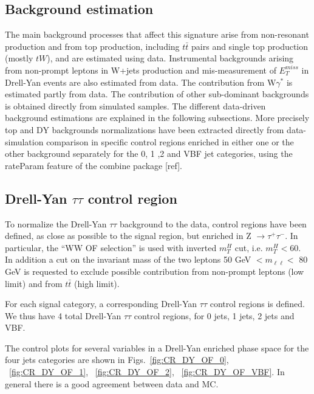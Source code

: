 \newpage
\subsection*{Background estimation}
The main background processes that affect this signature arise from non-resonant \WW production and from top production, including $t \bar{t}$ pairs and single top production (mostly $tW$), and are estimated using data. Instrumental backgrounds arising from non-prompt leptons in
W+jets production and mis-measurement of $E_T^{miss}$ in Drell-Yan events are also estimated from
data. The contribution from W$\gamma^*$  is estimated partly from data. The
contribution of other sub-dominant backgrounds is obtained directly from simulated samples. The different data-driven background estimations are explained in the following subsections. More precisely top and DY backgrounds normalizations have been extracted
directly from data-simulation comparison in specific control regions enriched in either one
or the other background separately for the 0, 1 ,2 and VBF jet categories, using the rateParam feature of the combine package [ref].
\subsection*{Drell-Yan $\tau\tau$ control region}
To normalize the Drell-Yan $\tau\tau$ background to the data, control regions
have been defined, as close as possible to the signal region, but enriched in
Z $\rightarrow \tau^+ \tau^-$. In particular, the ``WW OF selection'' is used with
inverted $m_T^H$ cut, i.e. $m_T^H<60$. In addition a cut on the invariant mass
of the two leptons 50 GeV $< m_{\ell \ell} <$ 80 GeV is requested to exclude
possible contribution from non-prompt leptons (low limit) and from  $t \bar{t}$ (high
limit).

For each signal category, a corresponding Drell-Yan $\tau\tau$ control
regions is defined. We thus have 4 total  Drell-Yan $\tau\tau$ control
regions, for 0 jets, 1 jets, 2 jets and VBF.

The control plots for several variables in a Drell-Yan enriched phase space
for the four jets categories are shown in Figs.~\ref{fig:CR_DY_OF_0},
~\ref{fig:CR_DY_OF_1}, ~\ref{fig:CR_DY_OF_2}, ~\ref{fig:CR_DY_OF_VBF}.
In general there is a good agreement between data and MC.\\

